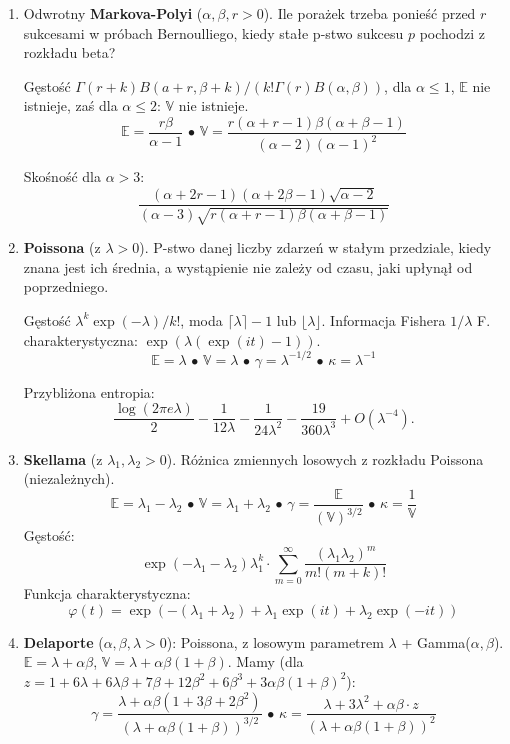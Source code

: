 \documentclass[a4paper, landscape]{extarticle}
\newcommand{\expected}{\mathbb{E}}
\newcommand{\variance}{\mathbb{V}}
\newenvironment{enumx}{\begin{enumerate} \setlength{\itemsep}{0pt} \setlength{\parskip}{0pt} \setlength{\parsep}{0pt}}{\end{enumerate}}
\begin{document}
\begin{multicols*}{3}
\begin{enumx}
	Funkcja charakterystyczna: \[\frac{\exp(iat) - \exp(i(b+1)t)}{n(1- \exp(it))}\]

\item Odwrotny \textbf{Markova-Polyi} ($\alpha, \beta, r > 0$).
	Ile porażek trzeba ponieść przed $r$ sukcesami w próbach Bernoulliego, kiedy stałe p-stwo sukcesu $p$ pochodzi z rozkładu beta?

	Gęstość $\Gamma(r+k) B(a+r, \beta + k) / (k! \Gamma(r) B(\alpha, \beta))$, dla $\alpha \le 1$, $\expected$ nie istnieje, zaś dla $\alpha \le 2$: $\variance$ nie istnieje.
	\[
		\expected = \frac{r \beta}{\alpha - 1} \,\bullet\,
		\variance = \frac{r (\alpha + r -1) \beta (\alpha + \beta - 1)}{(\alpha-2)(\alpha-1)^2}
	\]

	Skośność dla $\alpha >3$: \[\frac{(\alpha + 2r -1)(\alpha + 2\beta - 1) \sqrt{\alpha-2}}{(\alpha - 3) \sqrt{r(\alpha + r-1)\beta (\alpha + \beta - 1)}}\]

\item \textbf{Poissona} (z $\lambda > 0$).
	P-stwo danej liczby zdarzeń w stałym przedziale, kiedy znana jest ich średnia, a wystąpienie nie zależy od czasu, jaki upłynął od poprzedniego.

	Gęstość $\lambda^k \exp(-\lambda) / k!$, moda $\lceil\lambda\rceil - 1$ lub $\lfloor \lambda \rfloor$.
	Informacja Fishera $1 / \lambda$
	F. charakterystyczna: $\exp(\lambda(\exp(it) - 1))$.
	\[
		\expected = \lambda \,\bullet\,
		\variance = \lambda \,\bullet\,
		\gamma = \lambda^{-1/2} \,\bullet\,
		\kappa = \lambda^{-1}
	\]

	Przybliżona entropia: \[\frac{\log (2 \pi e \lambda)}2 - \frac{1}{12 \lambda} - \frac{1}{24\lambda^2} - \frac{19}{360\lambda^3} + O(\lambda^{-4}).\]

\item \textbf{Skellama} (z $\lambda_1, \lambda_2 > 0$).
	Różnica zmiennych losowych z rozkładu Poissona (niezależnych).
	\[
		\expected = \lambda_1 - \lambda_2 \,\bullet\,
		\variance = \lambda_1 + \lambda_2 \,\bullet\,
		\gamma = \frac{\expected}{(\variance)^{3/2}} \,\bullet\,
		\kappa = \frac{1}{\variance	}
	\]
	Gęstość: \[\exp(-\lambda_1-\lambda_2) \lambda_1^k \cdot \sum_{m =0}^\infty \frac{(\lambda_1\lambda_2)^m}{m! (m+k)!}\]
	Funkcja charakterystyczna: \[\varphi(t) = \exp(-(\lambda_1+\lambda_2) + \lambda_1 \exp(it) + \lambda_2 \exp(-it))\]

\item \textbf{Delaporte} ($\alpha, \beta, \lambda > 0$): Poissona, z losowym parametrem $\lambda$ + Gamma($\alpha, \beta$).
	$\expected	= \lambda + \alpha \beta$, $\variance = \lambda + \alpha \beta (1 + \beta)$.
	Mamy (dla $z = 1+6\lambda+6\lambda\beta+7\beta+12\beta^2+6\beta^3+3\alpha\beta(1+\beta)^2$):
	\[
		\gamma = \frac{\lambda + \alpha \beta(1 + 3 \beta + 2 \beta^2)}{(\lambda + \alpha \beta ( 1 + \beta))^{3/2}}
\,\bullet\,
		\kappa = \frac{\lambda + 3 \lambda^2 + \alpha \beta \cdot z}{(\lambda + \alpha \beta (1+ \beta))^2}
	\]


\end{enumx}
\end{multicols*}
\end{document}
